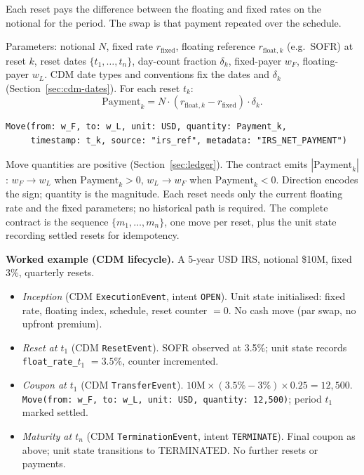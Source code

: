Each reset pays the difference between the floating and fixed rates on the notional for the period. The swap is that payment repeated over the schedule.

\noindent Parameters: notional $N$, fixed rate $r_{\text{fixed}}$, floating reference $r_{\text{float},k}$ (e.g.\ SOFR) at reset $k$, reset dates $\{t_1,\ldots,t_n\}$, day-count fraction $\delta_k$, fixed-payer $w_F$, floating-payer $w_L$. CDM date types and conventions fix the dates and $\delta_k$ (Section~\ref{sec:cdm-dates}). For each reset $t_k$:
\[
\text{Payment}_k = N \cdot (r_{\text{float},k} - r_{\text{fixed}}) \cdot \delta_k .
\]

\begin{lstlisting}
Move(from: w_F, to: w_L, unit: USD, quantity: Payment_k,
     timestamp: t_k, source: "irs_ref", metadata: "IRS_NET_PAYMENT")
\end{lstlisting}

\noindent Move quantities are positive (Section~\ref{sec:ledger}). The contract emits $|\text{Payment}_k|$: $w_F \to w_L$ when $\text{Payment}_k > 0$, $w_L \to w_F$ when $\text{Payment}_k < 0$. Direction encodes the sign; quantity is the magnitude. Each reset needs only the current floating rate and the fixed parameters; no historical path is required. The complete contract is the sequence $\{m_1,\ldots,m_n\}$, one move per reset, plus the unit state recording settled resets for idempotency.

\medskip
\noindent\textbf{Worked example (CDM lifecycle).} A 5-year USD IRS, notional \$10M, fixed 3\%, quarterly resets.

\begin{itemize}[nosep]
\item \emph{Inception} (CDM \texttt{ExecutionEvent}, intent \texttt{OPEN}). Unit state initialised: fixed rate, floating index, schedule, reset counter $=0$. No cash move (par swap, no upfront premium).
\item \emph{Reset at $t_1$} (CDM \texttt{ResetEvent}). SOFR observed at 3.5\%; unit state records \texttt{float\_rate\_$t_1$} $=3.5\%$, counter incremented.
\item \emph{Coupon at $t_1$} (CDM \texttt{TransferEvent}). $10\text{M}\times(3.5\%-3\%)\times0.25 = 12{,}500$. \texttt{Move(from: w\_F, to: w\_L, unit: USD, quantity: 12{,}500)}; period $t_1$ marked settled.
\item \emph{Maturity at $t_n$} (CDM \texttt{TerminationEvent}, intent \texttt{TERMINATE}). Final coupon as above; unit state transitions to TERMINATED. No further resets or payments.
\end{itemize}

\clearpage


